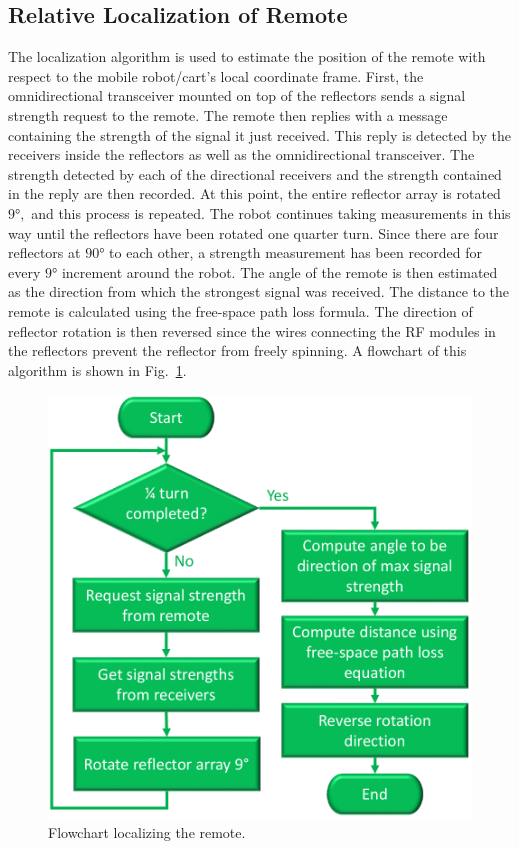 \documentclass[conference]{IEEEtran}
\begin{document}
\subsection{Relative Localization of Remote}
The localization algorithm is used to estimate the position of the remote with
respect to the mobile robot/cart's local coordinate frame. First, the omnidirectional
transceiver mounted on top of the reflectors sends a signal strength request to the
remote. The remote then replies with a message containing the strength of the
signal it just received. This reply is detected by the receivers inside the
reflectors as well as the omnidirectional transceiver. The strength detected by
each of the directional receivers and the strength contained in the reply are
then recorded. At this point, the entire reflector array is rotated
$\ang{9},$ and this process is repeated. The robot continues taking
measurements in this way until the reflectors have been rotated one quarter
turn. Since there are four reflectors at $\ang{90}$ to each other, a strength
measurement has been recorded for every $\ang{9}$ increment around the robot.
The angle of the remote is then estimated as the direction from which the
strongest signal was received. The distance to the remote is calculated using
the free-space path loss formula. The direction of reflector rotation is then
reversed since the wires connecting the RF modules in the reflectors prevent the
reflector from freely spinning. A flowchart of this algorithm is shown in Fig.~\ref{fig:localizationAlgoFlowchart}. %
%
\begin{figure}[htbp]
    \centering
    \includegraphics[width=.48\textwidth]{figs/localizationAlgorithmFlowchart.pdf}
    \caption{Flowchart localizing the remote.}
    \label{fig:localizationAlgoFlowchart}
\end{figure}
\end{document}
